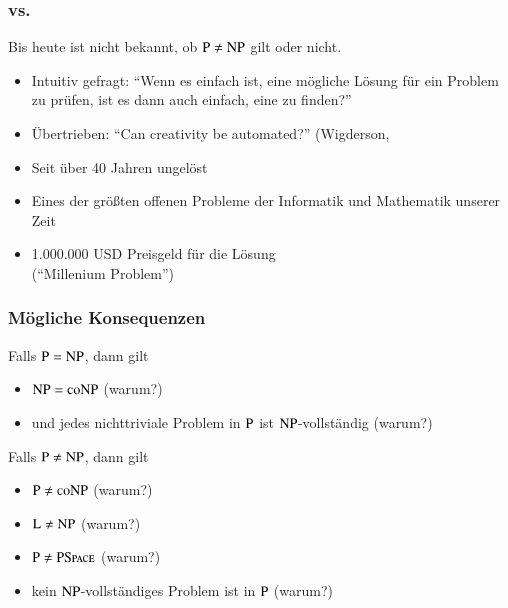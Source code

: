 \documentclass[aspectratio=1610,onlymath]{beamer}
\begin{document}
\begin{frame}\frametitle{ vs. }

  \alert{Bis heute ist nicht bekannt, ob ${\textsc{P}}\neq{\textsc{NP}}$ gilt oder nicht.}
  \begin{itemize}
  \item Intuitiv gefragt: "`Wenn es einfach ist, eine mögliche Lösung für ein Problem zu prüfen, ist es dann auch einfach, eine zu finden?"'
  \item Übertrieben: "`Can creativity be automated?"' (Wigderson, 
  \item Seit über 40 Jahren ungelöst
  \item Eines der größten offenen Probleme der Informatik und Mathematik unserer Zeit
  \item 1.000.000 USD Preisgeld für die Lösung\\("`Millenium Problem"')
  \end{itemize}

\end{frame}

\begin{frame}\frametitle{Mögliche Konsequenzen}

\alert{Falls ${\textsc{P}}={\textsc{NP}}$, dann gilt}
\begin{itemize}
\item ${\textsc{NP}}={\textsc{coNP}}$ (warum?)
\item und jedes nichttriviale Problem in ${\textsc{P}}$ ist ${\textsc{NP}}$-vollständig (warum?)
\end{itemize}
\bigskip\pause

\alert{Falls ${\textsc{P}}\neq{\textsc{NP}}$, dann gilt}
\begin{itemize}
\item ${\textsc{P}}\neq{\textsc{coNP}}$ (warum?)
\item ${\textsc{L}}\neq{\textsc{NP}}$ (warum?)
\item ${\textsc{P}}\neq{\textsc{PSpace}}$ (warum?)
\item kein ${\textsc{NP}}$-vollständiges Problem ist in ${\textsc{P}}$ (warum?)
\end{itemize}

\end{frame}
\end{document}
